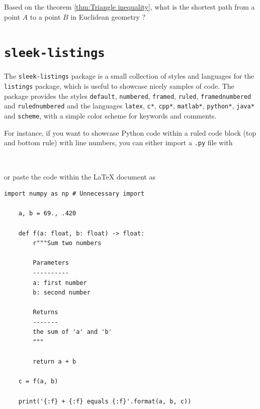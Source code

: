 \documentclass[a4paper, 12pt]{report}
\begin{document}
    \begin{fmd-question*}
        Based on the theorem \ref{thm:Triangle inequality}, what is the shortest path from a point $A$ to a point $B$ in Euclidean geometry ?
    \end{fmd-question*}

    \newpage

    \section{\texttt{sleek-listings}}

    The \texttt{sleek-listings} package is a small collection of styles and languages for the \texttt{listings} package, which is useful to showcase nicely samples of code. The package provides the styles \texttt{default}, \texttt{numbered}, \texttt{framed}, \texttt{ruled}, \texttt{framednumbered} and \texttt{rulednumbered} and the languages \texttt{latex}, \texttt{c*}, \texttt{cpp*}, \texttt{matlab*}, \texttt{python*}, \texttt{java*} and \texttt{scheme}, with a simple color scheme for keywords and comments.

    For instance, if you want to showcase Python code within a ruled code block (top and bottom rule) with line numbers, you can either import a \texttt{.py} file with

    \begin{lstlisting}[style=ruled, language=latex, gobble=4]
    
    \end{lstlisting}

    or paste the code within the \LaTeX{} document as

    \begin{lstlisting}[style=rulednumbered, language=python*, gobble=4]
    import numpy as np # Unnecessary import

    a, b = 69., .420

    def f(a: float, b: float) -> float:
        r"""Sum two numbers

        Parameters
        ----------
        a: first number
        b: second number

        Returns
        -------
        the sum of 'a' and 'b'
        """

        return a + b

    c = f(a, b)

    print('{:f} + {:f} equals {:f}'.format(a, b, c))
    \end{lstlisting}
\end{document}
